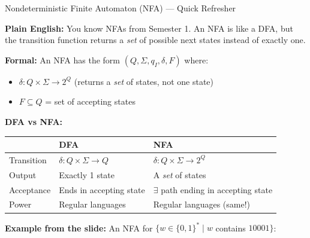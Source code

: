 \documentclass[11pt,a4paper]{article}
\begin{document}
\begin{definitionbox}{Nondeterministic Finite Automaton (NFA) --- Quick Refresher}

\textbf{Plain English:} You know NFAs from Semester 1. An NFA is like a DFA, but the transition function returns a \textit{set} of possible next states instead of exactly one.

\textbf{Formal:} An NFA has the form $(Q, \Sigma, q_I, \delta, F)$ where:
\begin{itemize}[nosep]
\item $\delta\colon Q \times \Sigma \to 2^Q$ \quad (returns a \textit{set} of states, not one state)
\item $F \subseteq Q$ = set of accepting states
\end{itemize}

\textbf{DFA vs NFA:}
\begin{center}
\begin{tabular}{lll}
\toprule
& \textbf{DFA} & \textbf{NFA} \\
\midrule
Transition & $\delta\colon Q \times \Sigma \to Q$ & $\delta\colon Q \times \Sigma \to 2^Q$ \\
Output & Exactly 1 state & A \textit{set} of states \\
Acceptance & Ends in accepting state & $\exists$ path ending in accepting state \\
Power & Regular languages & Regular languages (same!) \\
\bottomrule
\end{tabular}
\end{center}

\textbf{Example from the slide:} An NFA for $\{w \in \{0,1\}^* \mid w$ contains $10001\}$:

\begin{center}
\end{center}


\end{definitionbox}
\end{document}
